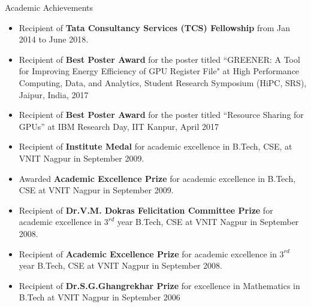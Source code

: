 \documentclass{resume} %
\begin{document}
\begin{comment}
\begin{rSection}{Ph.D Thesis}{\hspace{6 mm}   \textit{Thesis Supervisor : Prof. Amey Karkare, Department of CSE, IIT Kanpur }}

\begin{itemize}
\item \textbf{Title:} Hardware and Software Optimizations for GPU Resource Management
\end{itemize}

\end{rSection}
\end{comment}



\begin{rSection}{Academic Achievements}
\begin{itemize}
\item Recipient of \textbf{Tata Consultancy Services (TCS) Fellowship} from Jan 2014 to June 2018.
\item Recipient of \textbf{Best Poster Award} for the poster titled ``GREENER: A Tool for Improving Energy Efficiency of GPU Register File" at High Performance Computing, Data, and Analytics, Student Research Symposium (HiPC, SRS), Jaipur, India, 2017
\item Recipient of \textbf{Best Poster Award} for the poster titled “Resource Sharing for GPUs” at IBM Research Day, IIT Kanpur, April 2017
\item Recipient of \textbf{Institute Medal} for academic excellence in B.Tech, CSE,  at VNIT Nagpur in September 2009.
\item Awarded \textbf{Academic Excellence Prize} for academic excellence in B.Tech, CSE at VNIT Nagpur in September 2009.
\item Recipient of \textbf{Dr.V.M. Dokras Felicitation Committee Prize} for academic excellence in $3^{rd}$ year B.Tech, CSE at VNIT Nagpur in September 2008.
\item Recipient of \textbf{Academic Excellence Prize} for academic excellence in $3^{rd}$ year B.Tech, CSE at VNIT Nagpur in September 2008.
\item Recipient of \textbf{Dr.S.G.Ghangrekhar Prize} for excellence in Mathematics in B.Tech at VNIT Nagpur in September 2006
\end{itemize}
\end{rSection}
\end{document}
